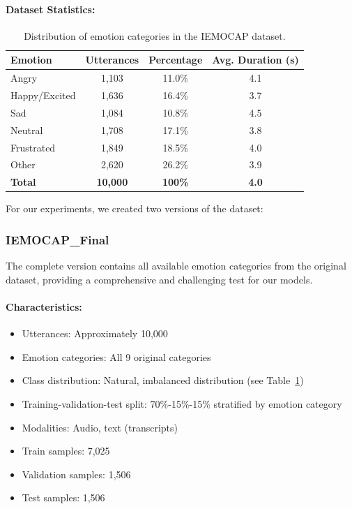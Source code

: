 \documentclass[12pt]{article}
\begin{document}
\paragraph{Dataset Statistics:}
\begin{table}[h]
\centering
\begin{tabular}{|l|c|c|c|}
\hline
\textbf{Emotion} & \textbf{Utterances} & \textbf{Percentage} & \textbf{Avg. Duration (s)} \\
\hline
Angry & 1,103 & 11.0\% & 4.1 \\
\hline
Happy/Excited & 1,636 & 16.4\% & 3.7 \\
\hline
Sad & 1,084 & 10.8\% & 4.5 \\
\hline
Neutral & 1,708 & 17.1\% & 3.8 \\
\hline
Frustrated & 1,849 & 18.5\% & 4.0 \\
\hline
Other & 2,620 & 26.2\% & 3.9 \\
\hline
\textbf{Total} & \textbf{10,000} & \textbf{100\%} & \textbf{4.0} \\
\hline
\end{tabular}
\caption{Distribution of emotion categories in the IEMOCAP dataset.}
\label{tab:emotion_distribution}
\end{table}

For our experiments, we created two versions of the dataset:

\subsubsection{IEMOCAP\_Final}
The complete version contains all available emotion categories from the original dataset, providing a comprehensive and challenging test for our models. 

\paragraph{Characteristics:}
\begin{itemize}
    \item Utterances: Approximately 10,000
    \item Emotion categories: All 9 original categories
    \item Class distribution: Natural, imbalanced distribution (see Table~\ref{tab:emotion_distribution})
    \item Training-validation-test split: 70\%-15\%-15\% stratified by emotion category
    \item Modalities: Audio, text (transcripts)
    \item Train samples: 7,025
    \item Validation samples: 1,506
    \item Test samples: 1,506
\end{itemize}
\end{document}
